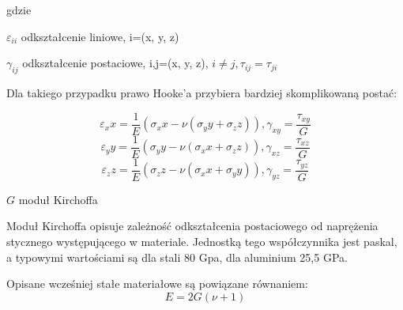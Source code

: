 gdzie

\begin{eqwhere}[2cm]
        \item[$\varepsilon_{ii}$] odkształcenie liniowe, i=(x, y, z)
        \item[$\gamma_{ij}$] odkształcenie postaciowe, i,j=(x, y, z), \( i \neq j, \tau_{ij}=\tau_{ji}\)
\end{eqwhere}

Dla takiego przypadku prawo Hooke'a przybiera bardziej skomplikowaną postać:

\begin{equation}
\varepsilon_xx=\frac{1}{E}(\sigma_xx-\nu(\sigma_yy+\sigma_zz)), \gamma_{xy}=\frac{\tau_{xy}}{G}
\end{equation}
\begin{equation}
\varepsilon_yy=\frac{1}{E}(\sigma_yy-\nu(\sigma_xx+\sigma_zz)), \gamma_{xz}=\frac{\tau_{xz}}{G}
\end{equation}
\begin{equation}
\varepsilon_zz=\frac{1}{E}(\sigma_zz-\nu(\sigma_xx+\sigma_yy)), \gamma_{yz}=\frac{\tau_{yz}}{G}
\end{equation}

\begin{eqwhere}[2cm]
        \item[$G$] moduł Kirchoffa
\end{eqwhere}

	Moduł Kirchoffa opisuje zależność odkształcenia postaciowego od naprężenia stycznego występującego w materiale. Jednostką tego współczynnika jest paskal, a typowymi wartościami są dla stali 80 Gpa, dla aluminium 25,5 GPa.

	Opisane wcześniej stałe materiałowe są powiązane równaniem:
\begin{equation}
E=2G(\nu+1)
\end{equation}

